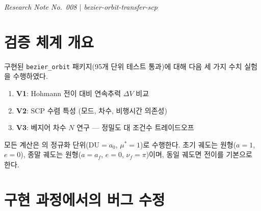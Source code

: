 \documentclass[11pt]{article}
\begin{document}
\drawborder
\thispagestyle{firstpage}


{\normalsize\textit{Research Note No.~008 $|$ bezier-orbit-transfer-scp}}\par\medskip

\def\lighterdate{March 13, 2026}


\begin{abstract}
\cite{report001}--\cite{report007}에서 유도한 베지어--SCP 궤적최적화 체계를 Python으로
구현하고, 세 가지 검증 시나리오(V1--V3)를 통해 수치적 타당성을 확인한다.
V1은 Hohmann 전이와의 $\Delta V$ 비교, V2는 SCP 수렴 특성 분석,
V3은 베지어 차수 $N$이 해의 정밀도에 미치는 영향을 다룬다.
또한 구현 과정에서 발견된 위치 경계조건의 $t_f^2$ 계수 오류와
SCP 완화(relaxation) 기법의 필요성을 보고한다.
\end{abstract}

\section{검증 체계 개요}

구현된 \texttt{bezier\_orbit} 패키지(95개 단위 테스트 통과)에 대해
다음 세 가지 수치 실험을 수행하였다.

\begin{enumerate}
  \item \textbf{V1}: Hohmann 전이 대비 연속추력 $\Delta V$ 비교
  \item \textbf{V2}: SCP 수렴 특성 (모드, 차수, 비행시간 의존성)
  \item \textbf{V3}: 베지어 차수 $N$ 연구 --- 정밀도 대 조건수 트레이드오프
\end{enumerate}

모든 계산은 \cite{report001}의 정규화 단위($\text{DU}=a_0$, $\mu^*=1$)로 수행한다.
초기 궤도는 원형($a=1$, $e=0$), 종말 궤도는 원형($a=a_f$, $e=0$, $\nu_f=\pi$)이며,
동일 궤도면 전이를 기본으로 한다.

\section{구현 과정에서의 버그 수정}
\label{sec:bugfix}
\end{document}
